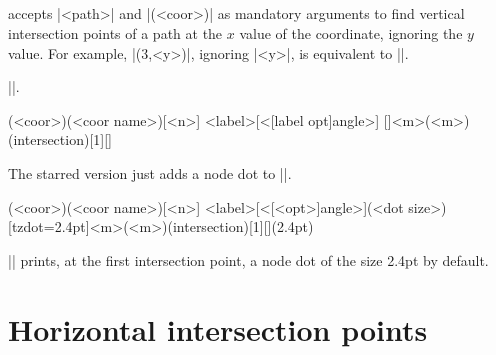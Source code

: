 \subsection{\protect\cmd{\tzvXpoint(*)}}
\label{ss:tzvXpoint}

\icmd{\tzvXpoint} accepts |{<path>}| and |(<coor>)| as mandatory arguments to find vertical intersection points of a path at the $x$ value of the coordinate, ignoring the $y$ value.
For example, |(3,<y>)|, ignoring |<y>|, is equivalent to ||.

 |\tzvXpointat|.

\begin{tzdef}{}
(<coor>)(<coor name>)[<n>]
          {<label>}[<[label opt]angle>]
  []{<m>}(<m>)(intersection)[1]{}[]
\end{tzdef}

The starred version \icmd{\tzvXpoint*} just adds a node dot to |\tzvXpoint|.

\begin{tzdef}{}
(<coor>)(<coor name>)[<n>]
           {<label>}[<[<opt>]angle>](<dot size>)
  [tzdot=2.4pt]{<m>}(<m>)(intersection)[1]{}[](2.4pt)
\end{tzdef}

|\tzvXpoint*| prints, at the first intersection point, a node dot of the size 2.4pt by default.

\begin{tzcode}{.3}
\end{tzcode}



\section{Horizontal intersection points}
\label{s:tzhXpointat}

\subsection{\protect\cmd{\tzhXpointat(*)}}
\label{ss:tzhXpointat}


